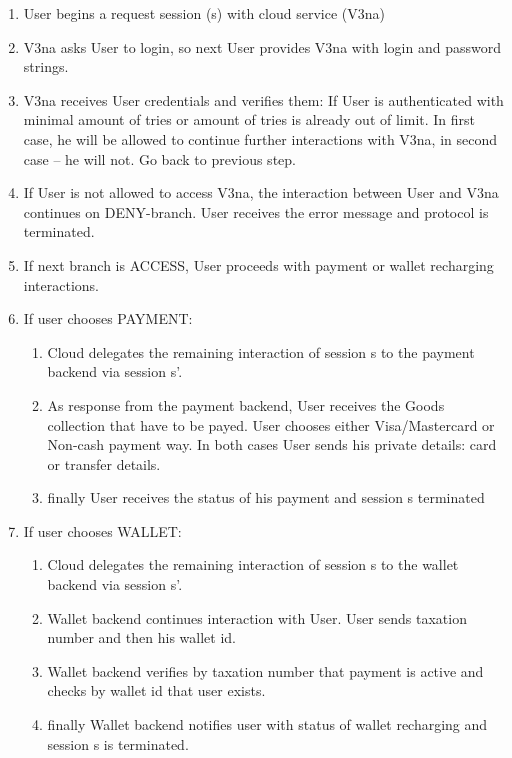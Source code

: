 \begin{enumerate}
\item  User begins a request session (s) with cloud service (V3na)

\item  V3na asks User to login, so next User provides V3na with login and password strings.

\item  V3na receives User credentials and verifies them: If User is authenticated with minimal amount of tries or amount of tries is already out of limit. In first case, he will be allowed to continue further interactions with V3na, in second case -- he will not. Go back to previous step.

\item  If User is not allowed to access V3na, the interaction between User and V3na continues on DENY-branch. User receives the error message and protocol is terminated.

\item  If next branch is ACCESS, User proceeds with payment or wallet recharging interactions.

\item  If user chooses PAYMENT: 

\begin{enumerate}
\item  Cloud delegates the remaining interaction of session s to the payment backend via session s'.

\item  As response from the payment backend, User receives the Goods collection that have to  be payed. User chooses either Visa/Mastercard or Non-cash payment way. In both cases User sends his private details: card or transfer details. 

\item  finally User receives the status of his payment and session s terminated
\end{enumerate}

\item  If user chooses WALLET:

\begin{enumerate}
\item  Cloud delegates the remaining interaction of session s to the wallet backend via session s'.

\item  Wallet backend continues interaction with User. User sends taxation number and then his wallet id. 

\item  Wallet backend verifies by taxation number that payment is active and checks by wallet id that user exists.

\item  finally Wallet backend notifies user with status of wallet recharging and session s is terminated.
\end{enumerate}
\end{enumerate}

